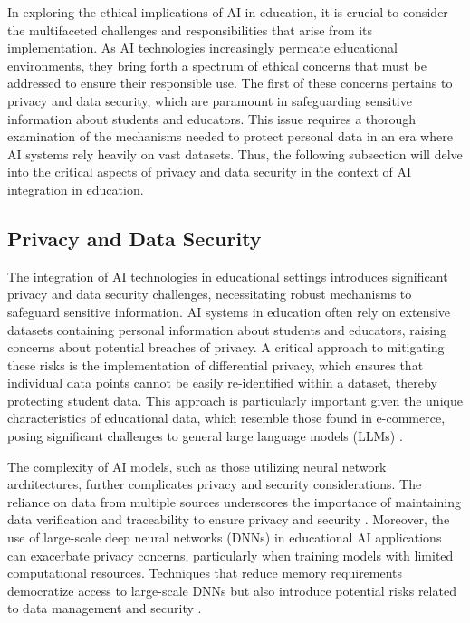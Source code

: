In exploring the ethical implications of AI in education, it is crucial to consider the multifaceted challenges and responsibilities that arise from its implementation. As AI technologies increasingly permeate educational environments, they bring forth a spectrum of ethical concerns that must be addressed to ensure their responsible use. The first of these concerns pertains to privacy and data security, which are paramount in safeguarding sensitive information about students and educators. This issue requires a thorough examination of the mechanisms needed to protect personal data in an era where AI systems rely heavily on vast datasets. Thus, the following subsection will delve into the critical aspects of privacy and data security in the context of AI integration in education.






\subsection{Privacy and Data Security} \label{subsec:Privacy and Data Security}

The integration of AI technologies in educational settings introduces significant privacy and data security challenges, necessitating robust mechanisms to safeguard sensitive information. AI systems in education often rely on extensive datasets containing personal information about students and educators, raising concerns about potential breaches of privacy. A critical approach to mitigating these risks is the implementation of differential privacy, which ensures that individual data points cannot be easily re-identified within a dataset, thereby protecting student data. This approach is particularly important given the unique characteristics of educational data, which resemble those found in e-commerce, posing significant challenges to general large language models (LLMs) \cite{tao2024rolecraftglmadvancingpersonalizedroleplaying}.

The complexity of AI models, such as those utilizing neural network architectures, further complicates privacy and security considerations. The reliance on data from multiple sources underscores the importance of maintaining data verification and traceability to ensure privacy and security \cite{brandao2020fairnavigationplanninghumanitarian}. Moreover, the use of large-scale deep neural networks (DNNs) in educational AI applications can exacerbate privacy concerns, particularly when training models with limited computational resources. Techniques that reduce memory requirements democratize access to large-scale DNNs but also introduce potential risks related to data management and security \cite{ramasubramanian2009teachingresultanalysisusing}.

